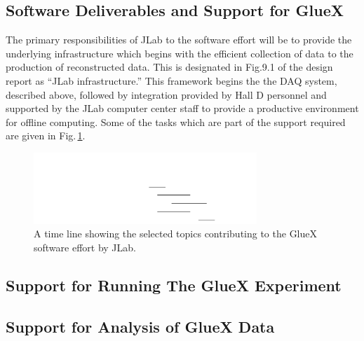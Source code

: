 \documentclass[oneside,12pt,letterpaper]{article}
\newcommand{\gx}{\mbox{GlueX}}
\begin{document}

\subsection{Software Deliverables and Support for \gx{} }
The primary responsibilities of JLab to the software effort will
be to provide the underlying infrastructure which begins with the efficient
collection of data to the production of reconstructed data. 
This is designated in Fig.9.1 of the design report as ``JLab infrastructure.''
This framework begins the the DAQ system, described
above, followed by integration provided by Hall D personnel and supported
by the JLab computer center staff to provide a productive environment
for offline computing. Some of the tasks which are part of the 
support required are given in Fig.\,\ref{fig:computing_timeline}. 

\begin{figure}[h!]\centering
\includegraphics[width=0.75\textwidth]{computing_timeline.pdf}
\caption[]{\label{fig:computing_timeline} A time line showing the
selected topics contributing to the GlueX software effort by
JLab.}
\end{figure}


\subsection{Support for Running The \gx{} Experiment}
%
%
\subsection{Support for Analysis of \gx{} Data}
%
%
\end{document}
